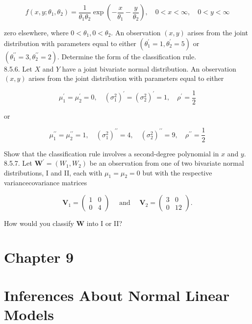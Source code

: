 $$
f\left(x, y ; \theta_{1}, \theta_{2}\right)=\frac{1}{\theta_{1} \theta_{2}} \exp \left(-\frac{x}{\theta_{1}}-\frac{y}{\theta_{2}}\right), \quad 0<x<\infty, \quad 0<y<\infty
$$

zero elsewhere, where $0<\theta_{1}, 0<\theta_{2}$. An observation $(x, y)$ arises from the joint distribution with parameters equal to either $\left(\theta_{1}^{\prime}=1, \theta_{2}^{\prime}=5\right)$ or $\left(\theta_{1}^{\prime \prime}=3, \theta_{2}^{\prime \prime}=2\right)$. Determine the form of the classification rule.\\
8.5.6. Let $X$ and $Y$ have a joint bivariate normal distribution. An observation $(x, y)$ arises from the joint distribution with parameters equal to either

$$
\mu_{1}^{\prime}=\mu_{2}^{\prime}=0, \quad\left(\sigma_{1}^{2}\right)^{\prime}=\left(\sigma_{2}^{2}\right)^{\prime}=1, \quad \rho^{\prime}=\frac{1}{2}
$$

or

$$
\mu_{1}^{\prime \prime}=\mu_{2}^{\prime \prime}=1, \quad\left(\sigma_{1}^{2}\right)^{\prime \prime}=4, \quad\left(\sigma_{2}^{2}\right)^{\prime \prime}=9, \quad \rho^{\prime \prime}=\frac{1}{2}
$$

Show that the classification rule involves a second-degree polynomial in $x$ and $y$.\\
8.5.7. Let $\boldsymbol{W}^{\prime}=\left(W_{1}, W_{2}\right)$ be an observation from one of two bivariate normal distributions, I and II, each with $\mu_{1}=\mu_{2}=0$ but with the respective variancecovariance matrices

$$
\boldsymbol{V}_{1}=\left(\begin{array}{ll}
1 & 0 \\
0 & 4
\end{array}\right) \quad \text { and } \quad \boldsymbol{V}_{2}=\left(\begin{array}{cc}
3 & 0 \\
0 & 12
\end{array}\right) .
$$

How would you classify $\boldsymbol{W}$ into I or II?

\section*{Chapter 9}
\section*{Inferences About Normal Linear Models}
